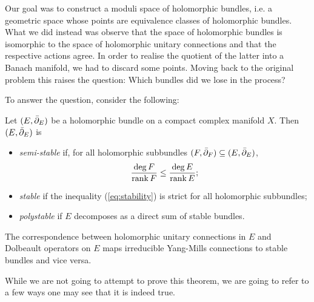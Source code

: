 \documentclass[12pt]{ociamthesis}  %
\begin{document}
Our goal was to construct a moduli space of holomorphic bundles,
i.e. a geometric space whose points are equivalence classes of
holomorphic bundles. What we did instead was observe that the space
of holomorphic bundles is isomorphic to the space of holomorphic unitary
connections and that the respective actions agree. In order to realise
the quotient of the latter into a Banach manifold, we had to discard
some points. Moving back to the original problem this raises
the question: Which bundles did we lose in the process?

To answer the question, consider the following:
\begin{definition}
  Let $(E,{\bar{\partial}}_E)$ be a holomorphic bundle on a compact complex
  manifold $X$. Then $(E,{\bar{\partial}}_E)$ is
  \begin{itemize}
    \item \emph{semi-stable} if, for all holomorphic subbundles
      $(F,{\bar{\partial}}_F)\subseteq (E,{\bar{\partial}}_E)$,
      \begin{align}\label{eq:stability}
        \frac{\deg F}{\operatorname{rank} F} \leq \frac{\deg E}{\operatorname{rank} E};
      \end{align}
    \item \emph{stable} if the inequality (\ref{eq:stability})
      is strict for all holomorphic subbundles;
    \item \emph{polystable} if $E$ decomposes as a direct sum of
      stable bundles.
  \end{itemize} 
\end{definition}

\begin{theorem}\label{thm:duy}
  The correspondence between holomorphic unitary connections in $E$ and
  Dolbeault operators on $E$ maps irreducible Yang-Mills connections to
  stable bundles and vice versa.
\end{theorem}

While we are not going to attempt to prove this theorem, we are
going to refer to a few ways one may see that it is indeed true.
\end{document}
